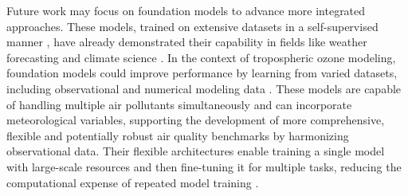 \documentclass[gmd, manuscript]{copernicus}
\begin{document}
Future work may focus on foundation models to advance more integrated approaches. These models, trained on extensive datasets in a self-supervised manner \citet{bommasani2021opportunities}, have already demonstrated their capability in fields like weather forecasting and climate science \citep{lessig2023atmorep, nguyen2023climax, Bodnar2024}. In the context of tropospheric ozone modeling, foundation models could improve performance by learning from varied datasets, including observational and numerical modeling data \citep{mukkavilli_ai_2023}. These models are capable of handling multiple air pollutants simultaneously and can incorporate meteorological variables, supporting the development of more comprehensive, flexible and potentially robust air quality benchmarks by harmonizing observational data. Their flexible architectures enable training a single model with large-scale resources and then fine-tuning it for multiple tasks, reducing the computational expense of repeated model training \citep{bommasani2021opportunities}. %


\end{document}
